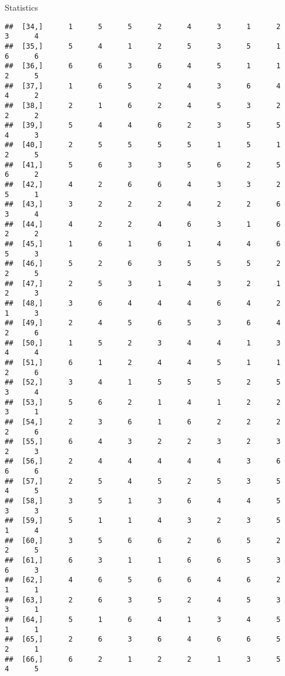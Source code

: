 \documentclass[
  ignorenonframetext,
]{beamer}
\begin{document}
\begin{frame}[fragile]{Statistics}
\begin{verbatim}
##  [34,]      1      5      5      2      4      3      1      2      3      4
##  [35,]      5      4      1      2      5      3      5      1      6      6
##  [36,]      6      6      3      6      4      5      1      1      2      5
##  [37,]      1      6      5      2      4      3      6      4      4      2
##  [38,]      2      1      6      2      4      5      3      2      2      2
##  [39,]      5      4      4      6      2      3      5      5      4      3
##  [40,]      2      5      5      5      5      1      5      1      2      5
##  [41,]      5      6      3      3      5      6      2      5      6      2
##  [42,]      4      2      6      6      4      3      3      2      5      1
##  [43,]      3      2      2      2      4      2      2      6      3      4
##  [44,]      4      2      2      4      6      3      1      6      2      2
##  [45,]      1      6      1      6      1      4      4      6      5      3
##  [46,]      5      2      6      3      5      5      5      2      2      5
##  [47,]      2      5      3      1      4      3      2      1      2      3
##  [48,]      3      6      4      4      4      6      4      2      1      3
##  [49,]      2      4      5      6      5      3      6      4      2      6
##  [50,]      1      5      2      3      4      4      1      3      4      4
##  [51,]      6      1      2      4      4      5      1      1      2      6
##  [52,]      3      4      1      5      5      5      2      5      3      4
##  [53,]      5      6      2      1      4      1      2      2      3      1
##  [54,]      2      3      6      1      6      2      2      2      2      6
##  [55,]      6      4      3      2      2      3      2      3      2      3
##  [56,]      2      4      4      4      4      4      3      6      6      6
##  [57,]      2      5      4      5      2      5      3      5      4      5
##  [58,]      3      5      1      3      6      4      4      5      3      3
##  [59,]      5      1      1      4      3      2      3      5      1      4
##  [60,]      3      5      6      6      2      6      5      2      2      5
##  [61,]      6      3      1      1      6      6      5      3      6      3
##  [62,]      4      6      5      6      6      4      6      2      1      1
##  [63,]      2      6      3      5      2      4      5      3      3      1
##  [64,]      5      1      6      4      1      3      4      5      1      1
##  [65,]      2      6      3      6      4      6      6      5      2      1
##  [66,]      6      2      1      2      2      1      3      5      4      5

\end{verbatim}
\end{frame}
\end{document}
